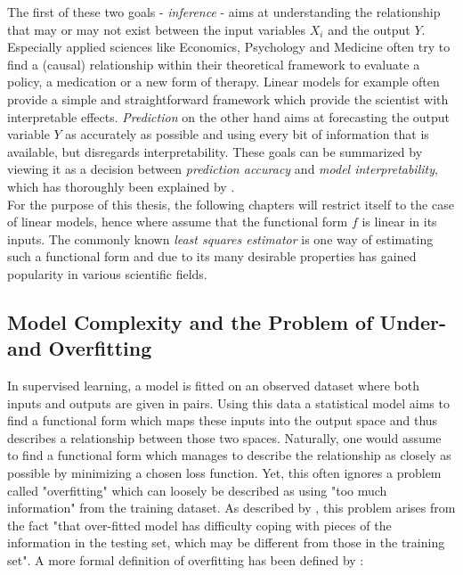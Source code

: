 \documentclass[12pt,a4paper]{article}
\begin{document}
The first of these two goals - \textit{inference} - aims at understanding the relationship that may or may not exist between the input variables $X_i$ and the output $Y$. Especially applied sciences like Economics, Psychology and Medicine often try to find a (causal) relationship within their theoretical framework to evaluate a policy, a medication or a new form of therapy. Linear models for example often provide a simple and straightforward framework which provide the scientist with interpretable effects. \textit{Prediction} on the other hand aims at forecasting the output variable $Y$ as accurately as possible and using every bit of information that is available, but disregards interpretability. \parencite[21]{ESL2009} These goals can be summarized by viewing it as a decision between \textit{prediction accuracy} and \textit{model interpretability}, which has thoroughly been explained by \textcite{ESL2009}.\\

For the purpose of this thesis, the following chapters will restrict itself to the case of linear models, hence where assume that the functional form $f$ is linear in its inputs. The commonly known \textit{least squares estimator} is one way of estimating such a functional form and due to its many desirable properties has gained popularity in various  scientific fields. 

\subsection{Model Complexity and the Problem of Under- and Overfitting}

In supervised learning, a model is fitted on an observed dataset where both inputs and outputs are given in pairs. Using this data a statistical model aims to find a functional form which maps these inputs into the output space and thus describes a relationship between those two spaces. Naturally, one would assume to find a functional form which manages to describe the relationship as closely as possible by minimizing a chosen loss function. Yet, this often ignores a problem called "overfitting" which can loosely be described as using "too much information" from the training dataset. As described by \textcite{Ying2019}, this problem arises from the fact "that over-fitted model has difficulty coping with pieces of the information in the testing set, which may be different from those in the training set". A more formal definition of overfitting has been defined by \textcite{Mitchell1997}:\\
\end{document}

